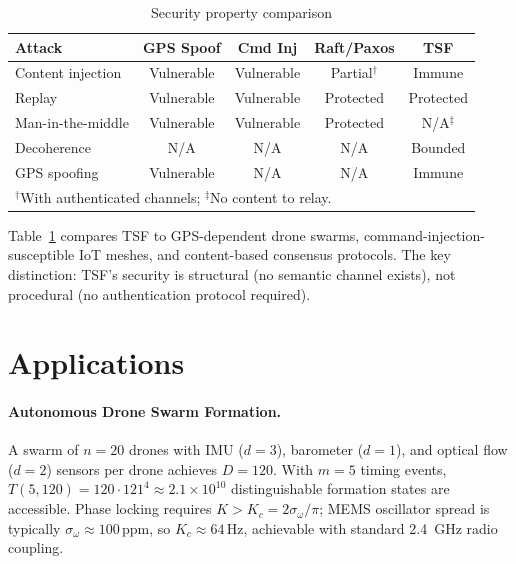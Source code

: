 \documentclass[twocolumn,10pt]{article}
\newcommand{\Kc}{K_c}
\newcommand{\sigmaomega}{\sigma_{\omega}}
\begin{document}
\begin{table}[t]
\centering
\caption{Security property comparison}
\label{tab:security}
\scriptsize
\begin{tabular}{@{}lcccc@{}}
\toprule
\textbf{Attack} & \textbf{GPS Spoof} & \textbf{Cmd Inj} & \textbf{Raft/Paxos} & \textbf{TSF} \\
\midrule
Content injection   & Vulnerable & Vulnerable & Partial$^\dagger$ & Immune \\
Replay              & Vulnerable & Vulnerable & Protected  & Protected \\
Man-in-the-middle   & Vulnerable & Vulnerable & Protected  & N/A$^\ddagger$ \\
Decoherence         & N/A        & N/A        & N/A        & Bounded \\
GPS spoofing        & Vulnerable & N/A        & N/A        & Immune \\
\bottomrule
\multicolumn{5}{l}{\scriptsize $^\dagger$With authenticated channels; $^\ddagger$No content to relay.}
\end{tabular}
\end{table}

Table~\ref{tab:security} compares TSF to GPS-dependent drone swarms,
command-injection-susceptible IoT meshes, and content-based consensus
protocols. The key distinction: TSF's security is structural (no semantic
channel exists), not procedural (no authentication protocol required).

\section{Applications}
\label{sec:applications}

\paragraph{Autonomous Drone Swarm Formation.}
A swarm of $n = 20$ drones with IMU ($d=3$), barometer ($d=1$), and optical
flow ($d=2$) sensors per drone achieves $D = 120$. With $m = 5$ timing events,
$T(5,120) = 120 \cdot 121^4 \approx 2.1 \times 10^{10}$ distinguishable
formation states are accessible. Phase locking requires $K > \Kc =
2\sigmaomega/\pi$; MEMS oscillator spread is typically $\sigmaomega \approx
100\,\mathrm{ppm}$, so $\Kc \approx 64\,\mathrm{Hz}$, achievable with
standard 2.4~GHz radio coupling.
\end{document}

